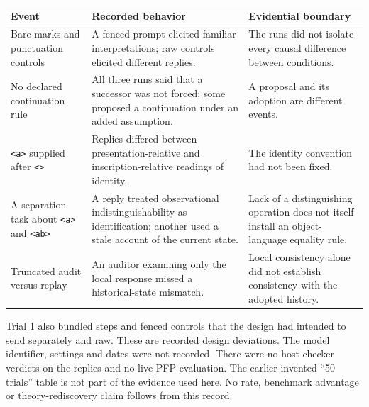 \documentclass[
  11pt,
]{article}
\begin{document}
\begin{longtable}[]{@{}
  >{\raggedright\arraybackslash}p{}
  >{\raggedright\arraybackslash}p{}
  >{\raggedright\arraybackslash}p{}@{}}
\toprule\noalign{}
\begin{minipage}[b]{\linewidth}\raggedright
Event
\end{minipage} & \begin{minipage}[b]{\linewidth}\raggedright
Recorded behavior
\end{minipage} & \begin{minipage}[b]{\linewidth}\raggedright
Evidential boundary
\end{minipage} \\
\midrule\noalign{}
\endhead
\bottomrule\noalign{}
\endlastfoot
Bare marks and punctuation controls & A fenced prompt elicited familiar
interpretations; raw controls elicited different replies. & The runs did
not isolate every causal difference between conditions. \\
No declared continuation rule & All three runs said that a successor was
not forced; some proposed a continuation under an added assumption. & A
proposal and its adoption are different events. \\
\texttt{\textless{}a\textgreater{}} supplied after
\texttt{\textless{}\textgreater{}} & Replies differed between
presentation-relative and inscription-relative readings of identity. &
The identity convention had not been fixed. \\
A separation task about \texttt{\textless{}a\textgreater{}} and
\texttt{\textless{}ab\textgreater{}} & A reply treated observational
indistinguishability as identification; another used a stale account of
the current state. & Lack of a distinguishing operation does not itself
install an object-language equality rule. \\
Truncated audit versus replay & An auditor examining only the local
response missed a historical-state mismatch. & Local consistency alone
did not establish consistency with the adopted history. \\
\end{longtable}

Trial 1 also bundled steps and fenced controls that the design had
intended to send separately and raw. These are recorded design
deviations. The model identifier, settings and dates were not recorded.
There were no host-checker verdicts on the replies and no live PFP
evaluation. The earlier invented ``50 trials'' table is not part of the
evidence used here. No rate, benchmark advantage or theory-rediscovery
claim follows from this record.
\end{document}
